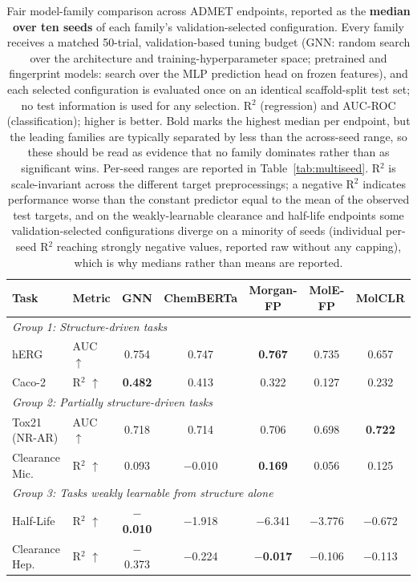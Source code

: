\documentclass[journal]{IEEEtran}
\begin{document}
\begin{table}[!t]
\centering
\caption{Fair model-family comparison across ADMET endpoints, reported as the \textbf{median over ten seeds} of each family's validation-selected configuration. Every family receives a matched 50-trial, validation-based tuning budget (GNN: random search over the architecture and training-hyperparameter space; pretrained and fingerprint models: search over the MLP prediction head on frozen features), and each selected configuration is evaluated once on an identical scaffold-split test set; no test information is used for any selection. R$^2$ (regression) and AUC-ROC (classification); higher is better. Bold marks the highest median per endpoint, but the leading families are typically separated by less than the across-seed range, so these should be read as evidence that no family dominates rather than as significant wins. Per-seed ranges are reported in Table~\ref{tab:multiseed}. R$^2$ is scale-invariant across the different target preprocessings; a negative R$^2$ indicates performance worse than the constant predictor equal to the mean of the observed test targets, and on the weakly-learnable clearance and half-life endpoints some validation-selected configurations diverge on a minority of seeds (individual per-seed R$^2$ reaching strongly negative values, reported raw without any capping), which is why medians rather than means are reported.}
\label{tab:model_comparison}
\small
\begin{tabular}{llccccc}
\toprule
\textbf{Task} & \textbf{Metric} & \textbf{GNN} & \textbf{ChemBERTa} & \textbf{Morgan-FP} & \textbf{MolE-FP} & \textbf{MolCLR} \\
\midrule
\multicolumn{7}{l}{\emph{Group 1: Structure-driven tasks}} \\
\midrule
hERG & AUC $\uparrow$ & 0.754 & 0.747 & \textbf{0.767} & 0.735 & 0.657 \\
Caco-2 & R$^2$ $\uparrow$ & \textbf{0.482} & 0.413 & 0.322 & 0.127 & 0.232 \\
\midrule
\multicolumn{7}{l}{\emph{Group 2: Partially structure-driven tasks}} \\
\midrule
Tox21 (NR-AR) & AUC $\uparrow$ & 0.718 & 0.714 & 0.706 & 0.698 & \textbf{0.722} \\
Clearance Mic. & R$^2$ $\uparrow$ & 0.093 & $-$0.010 & \textbf{0.169} & 0.056 & 0.125 \\
\midrule
\multicolumn{7}{l}{\emph{Group 3: Tasks weakly learnable from structure alone}} \\
\midrule
Half-Life & R$^2$ $\uparrow$ & \textbf{$-$0.010} & $-$1.918 & $-$6.341 & $-$3.776 & $-$0.672 \\
Clearance Hep. & R$^2$ $\uparrow$ & $-$0.373 & $-$0.224 & \textbf{$-$0.017} & $-$0.106 & $-$0.113 \\
\bottomrule
\end{tabular}
\end{table}
\end{document}

